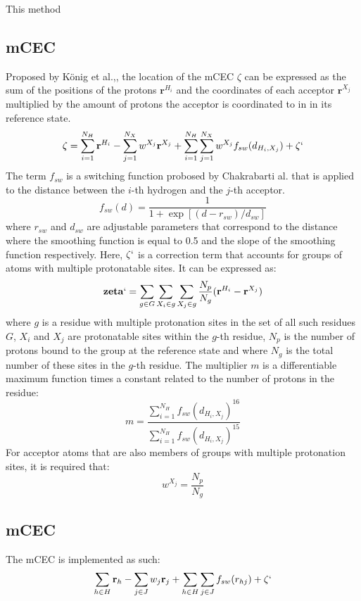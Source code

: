 \documentclass{article}
\newcommand{\mb}[1]{\mathbf{#1}}
\begin{document}
This method

\subsection{mCEC}
Proposed by K\"onig et al.,\cite{Konig2006}, the location of the mCEC $\zeta$ can be expressed as the sum of the positions of the protons $\mb{r}^{H_i}$ and the coordinates of each acceptor $\mb{r}^{X_j}$ multiplied by the amount of protons the acceptor is coordinated to in in its reference state.
\begin{equation}\label{eq:mcec}
\mb{\zeta} = \sum_{i=1}^{N_H} \mb{r}^{H_i} - \sum_{j=1}^{N_X} w^{X_j} \mb{r}^{X_j} + \sum_{i=1}^{N_H} \sum_{j=1}^{N_X} w^{X_j} f_{sw}(d_{H_i,X_j}) + \zeta`
\end{equation}
The term $f_{sw}$ is a switching function probosed by Chakrabarti al.\cite{Chakrabarti2004} that is applied to the distance between the $i$-th hydrogen and the $j$-th acceptor.
\begin{equation}\label{eq:chakra}
f_{sw}(d) = \frac{1}{1 + \exp[(d-r_{sw})/d_{sw}]}
\end{equation}
where $r_{sw}$ and $d_{sw}$ are adjustable parameters that correspond to the distance where the smoothing function is equal to 0.5 and the slope of the smoothing function respectively.
Here, $\zeta`$ is a correction term that accounts for groups of atoms with multiple protonatable sites. It can be expressed as:
\begin{equation}
\mb{zeta}` = \sum_{g \in G} \sum_{X_i\in g}\sum_{X_j \in g} \frac{N_p}{N_g} (\mb{r}^{H_i} - \mb{r}^{X_j})
\end{equation}
where $g$ is a residue with multiple protonation sites in the set of all such residues $G$, $X_i$ and $X_j$ are protonatable sites within the $g$-th residue, $N_p$ is the number of protons bound to the group at the reference state and where $N_g$ is the total number of these sites in the $g$-th residue. 
The multiplier $m$ is a differentiable maximum function times a constant related to the number of protons in the residue:
\begin{equation}
m = \frac{\sum_{i=1}^{N_H} f_{sw}(d_{H_i,X_j})^{16}}{\sum_{i=1}^{N_H}  f_{sw}(d_{H_i,X_j})^{15}}
\end{equation}
For acceptor atoms that are also members of groups with multiple protonation sites, it is required that:
\begin{equation}
w^{X_j} = \frac{N_p}{N_g}
\end{equation}
\subsection{mCEC}
The mCEC is implemented as such:
\begin{equation}
\sum_{h \in H} \mathbf{r}_h - \sum_{j \in J} w_j \mathbf{r}_j + \sum_{h \in H} \sum_{j \in J} f_{sw}(r_{hj}) + \zeta`
\end{equation}
\end{document}
